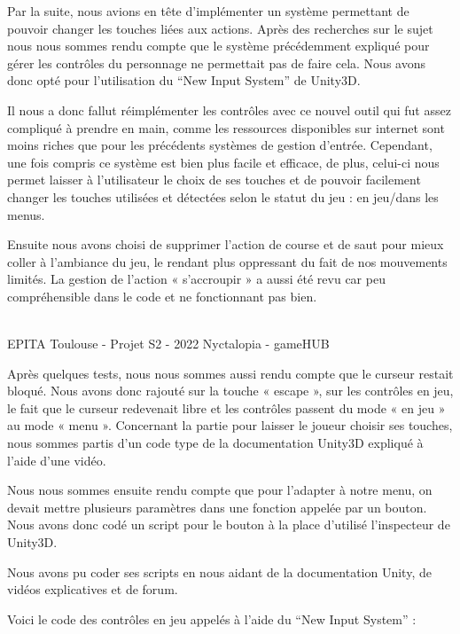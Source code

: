Par la suite, nous avions en tête d’implémenter un système permettant de pouvoir changer les touches liées aux actions. Après des recherches sur le sujet nous nous sommes rendu compte que le système précédemment expliqué pour gérer les contrôles du personnage ne permettait pas de faire cela. Nous avons donc opté pour l’utilisation du ``New Input System'' de Unity3D.

Il nous a donc fallut réimplémenter les contrôles avec ce nouvel outil qui fut assez compliqué à prendre en main, comme les ressources disponibles sur internet sont moins riches que pour les précédents systèmes de gestion d’entrée. Cependant, une fois compris ce système est bien plus facile et efficace, de plus, celui-ci nous permet laisser à l’utilisateur le choix de ses touches et de pouvoir facilement changer les touches utilisées et détectées selon le statut du jeu : en jeu/dans les menus.

Ensuite nous avons choisi de supprimer l’action de course et de saut pour mieux coller à l’ambiance du jeu, le rendant plus oppressant du fait de nos mouvements limités. La gestion de l’action « s’accroupir » a aussi été revu car peu compréhensible dans le code et ne fonctionnant pas bien.

\vfill
\noindent\makebox[\linewidth]{\rule{.8\paperwidth}{.6pt}}\\[0.2cm]
EPITA Toulouse - Projet S2 - 2022 \hfill Nyctalopia - gameHUB
\noindent\makebox[\linewidth]{\rule{.8\paperwidth}{.6pt}}

\newpage

Après quelques tests, nous nous sommes aussi rendu compte que le curseur restait bloqué. Nous avons donc rajouté sur la touche « escape », sur les contrôles en jeu, le fait que le curseur redevenait libre et les contrôles passent du mode « en jeu » au mode « menu ».
Concernant la partie pour laisser le joueur choisir ses touches, nous sommes partis d’un code type de la documentation Unity3D expliqué à l’aide d’une vidéo.

Nous nous sommes ensuite rendu compte que pour l’adapter à notre menu, on devait mettre plusieurs paramètres dans une fonction appelée par un bouton. Nous avons donc codé un script pour le bouton à la place d’utilisé l’inspecteur de Unity3D.

Nous avons pu coder ses scripts en nous aidant de la documentation Unity, de vidéos explicatives et de forum.

Voici le code des contrôles en jeu appelés à l'aide du ``New Input System'' :
\newline

